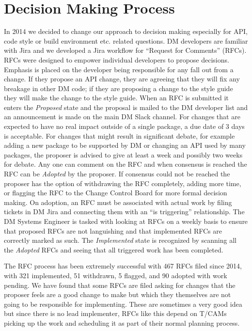 \section{Decision Making Process}
In 2014 we decided to change our approach to decision making especially for API, code style or build  environment etc. related questions.
DM developers are familiar with Jira and we developed a Jira workflow for ``Request for Comments'' (RFCs).
RFCs were designed to empower individual developers to propose decisions.
Emphasis is placed on the developer being responsible for any fall out from a change.
If they propose an API change, they are agreeing that they will fix any breakage in other DM code; if they are proposing a change to the style guide they will make the change to the style guide.
When an RFC is submitted it enters the \emph{Proposed} state and the proposal is mailed to the DM developer list and an announcement is made on the main DM Slack channel.
For changes that are expected to have no real impact outside of a single package, a due date of 3 days is acceptable.
For changes that might result in significant debate, for example adding a new package to be supported by DM or changing an API used by many packages, the proposer is advised to give at least a week and possibly two weeks for debate.
Any one can comment on the RFC and when consensus is reached the RFC can be \emph{Adopted} by the proposer.
If consensus could not be reached the proposer has the option of withdrawing the RFC completely, adding more time, or flagging the RFC to the Change Control Board for more formal decision making.
On adoption, an RFC must be associated with actual work by filing tickets in DM Jira and connecting them with an ``is triggering'' relationship.
The DM Systems Engineer is tasked with looking at RFCs on a weekly basis to ensure that proposed RFCs are not languishing and that implemented RFCs are correctly marked as such.
The \emph{Implemented} state is recognized by scanning all the \emph{Adopted} RFCs and seeing that all triggered work has been completed.

The RFC process has been extremely successful with 467 RFCs filed since 2014, with 321 implemented, 51 withdrawn, 5 flagged, and 90 adopted with work pending.
We have found that some RFCs are filed asking for changes that the proposer feels are a good change to make but which they themselves are not going to be responsible for implementing.
These are sometimes a very good idea but since there is no lead implementer, RFCs like this depend on T/CAMs picking up the work and scheduling it as part of their normal planning process.

